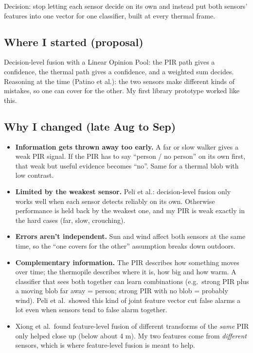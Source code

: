 \documentclass[11pt,a4paper]{article}
\providecommand{\tightlist}{\setlength{\itemsep}{0pt}\setlength{\parskip}{0pt}}
\begin{document}
Decision: stop letting each
sensor decide on its own and
instead put both sensors'
features into one vector for
one classifier, built at every
thermal frame.

\hypertarget{where-i-started-proposal}{%
\subsection{Where I started
(proposal)}\label{where-i-started-proposal}}

Decision-level fusion with a
Linear Opinion Pool: the PIR
path gives a confidence, the
thermal path gives a
confidence, and a weighted sum
decides. Reasoning at the time
(Patino et al.): the two
sensors make different kinds
of mistakes, so one can cover
for the other. My first
library prototype worked like
this.

\hypertarget{why-i-changed-late-aug-to-sep}{%
\subsection{Why I changed
(late Aug to
Sep)}\label{why-i-changed-late-aug-to-sep}}

\begin{itemize}
\tightlist
\item
  \textbf{Information gets
  thrown away too early.} A
  far or slow walker gives a
  weak PIR signal. If the PIR
  has to say ``person / no
  person'' on its own first,
  that weak but useful
  evidence becomes ``no''.
  Same for a thermal blob with
  low contrast.
\item
  \textbf{Limited by the
  weakest sensor.} Peli et
  al.: decision-level fusion
  only works well when each
  sensor detects reliably on
  its own. Otherwise
  performance is held back by
  the weakest one, and my PIR
  is weak exactly in the hard
  cases (far, slow,
  crouching).
\item
  \textbf{Errors aren't
  independent.} Sun and wind
  affect both sensors at the
  same time, so the ``one
  covers for the other''
  assumption breaks down
  outdoors.
\item
  \textbf{Complementary
  information.} The PIR
  describes how something
  moves over time; the
  thermopile describes where
  it is, how big and how warm.
  A classifier that sees both
  together can learn
  combinations (e.g.~strong
  PIR plus a moving blob far
  away = person; strong PIR
  with no blob = probably
  wind). Peli et al.~showed
  this kind of joint feature
  vector cut false alarms a
  lot even when sensors tend
  to false alarm together.
\item
  Xiong et al.~found
  feature-level fusion of
  different transforms of the
  \emph{same} PIR only helped
  close up (below about 4 m).
  My two features come from
  \emph{different} sensors,
  which is where feature-level
  fusion is meant to help.
\end{itemize}
\end{document}
